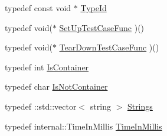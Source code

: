 \begin{DoxyCompactItemize}
\item 
typedef const void $\ast$ \hyperlink{namespacetesting_1_1internal_ac8e91f0c6a06c0361dc3152ddfeb2342}{\-Type\-Id}
\item 
typedef void($\ast$ \hyperlink{namespacetesting_1_1internal_abdd2548fdbf05907e439e416dab030ec}{\-Set\-Up\-Test\-Case\-Func} )()
\item 
typedef void($\ast$ \hyperlink{namespacetesting_1_1internal_a0d7d11b7ce3a8f9d969e0dfb543dde3d}{\-Tear\-Down\-Test\-Case\-Func} )()
\item 
typedef int \hyperlink{namespacetesting_1_1internal_a352c9f642298e3ae8c7eb84e3278ba65}{\-Is\-Container}
\item 
typedef char \hyperlink{namespacetesting_1_1internal_a7702df52e064b640254945414578e90c}{\-Is\-Not\-Container}
\item 
typedef \-::std\-::vector$<$ string $>$ \hyperlink{namespacetesting_1_1internal_a6d618e88721d4c38cbecabe0d2e8341c}{\-Strings}
\item 
typedef internal\-::\-Time\-In\-Millis \hyperlink{namespacetesting_a338e9fd9474f0d8fafcb28b05f66a630}{\-Time\-In\-Millis}
\end{DoxyCompactItemize}
